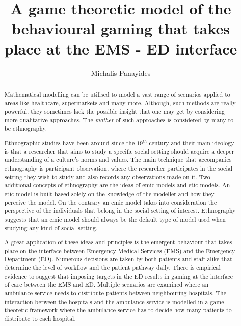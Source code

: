 \documentclass{article}
\title{A game theoretic model of the behavioural gaming that takes place at the EMS - ED interface}
\author{Michalis Panayides}
\begin{document}
\maketitle
\begin{abstract}
    Mathematical modelling can be utilised to model a vast range of scenarios applied to areas like healthcare, supermarkets and many more. Although, such methods are really powerful, they sometimes lack the possible insight that one may get by considering more qualitative approaches. The \textit{mother} of such approaches is considered by many to be ethnography. 

    Ethnographic studies have been around since the \(19^{th}\) century and their main ideology is that a researcher that aims to study a specific social setting should acquire a deeper understanding of a culture's norms and values. The main technique that accompanies ethnography is participant observation, where the researcher participates in the social setting they wish to study and also records any observations made on it. Two additional concepts of ethnography are the ideas of emic models and etic models. An etic model is built based solely on the knowledge of the modeller and how they perceive the model. On the contrary an emic model takes into consideration the perspective of the individuals that belong in the social setting of interest. Ethnography suggests that an emic model should always be the default type of model used when studying any kind of social setting.
    
    A great application of these ideas and principles is the emergent behaviour that takes place on the interface between Emergency Medical Services (EMS) and the Emergency Department (ED). Numerous decisions are taken by both patients and staff alike that determine the level of workflow and the patient pathway daily. There is empirical evidence to suggest that imposing targets in the ED results in gaming at the interface of care between the EMS and ED. Multiple scenarios are examined where an ambulance service needs to distribute patients between neighbouring hospitals. The interaction between the hospitals and the ambulance service is modelled in a game theoretic framework where the ambulance service has to decide how many patients to distribute to each hospital.
        
\end{abstract}
    
\end{document}
